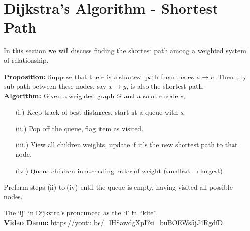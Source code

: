 \newpage
\section{Dijkstra's Algorithm - Shortest Path}
\noindent
In this section we will discuss finding the shortest path among a weighted system of relationship.

\begin{theo}
    
    \textbf{Proposition:} Suppose that there is a shortest path from nodes $u\to v$. Then any
    sub-path between these nodes, say $x\to y$, is also the shortest path.\\

    \noindent
    \textbf{Algorithm:} Given a weighted graph $G$ and a source node $s$, 
    \begin{enumerate}
        \item [(i.)] Keep track of best distances, start at a queue with $s$.
        \item [(ii.)] Pop off the queue, flag item as visited.
        \item [(iii.)] View all children weights, update if it's the new shortest path to that node.
        \item [(iv.)] Queue children in ascending order of weight (smallest$\to$largest)
    \end{enumerate}
    Preform steps (ii) to (iv) until the queue is empty, having visited all possible nodes.
\end{theo}

\vspace{-.5em}
\begin{Tip}
    The `ij' in Dijkstra's pronounced as the `i' in ``kite''.\\
    \textbf{Video Demo:} \url{https://youtu.be/_lHSawdgXpI?si=buBOEWs5jJ4RgdfD}
\end{Tip}

